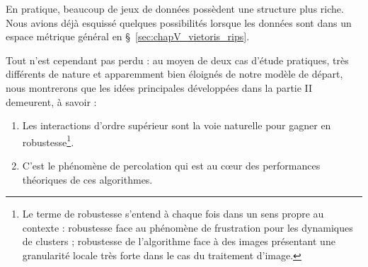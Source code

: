 \documentclass{these-ISSS} %
\begin{document}
En pratique, beaucoup de jeux de données possèdent une structure plus riche.
Nous avions déjà esquissé quelques possibilités lorsque les données sont dans un espace métrique général en \S~\ref{sec:chapV_vietoris_rips}.

Tout n'est cependant pas perdu : au moyen de deux cas d'étude pratiques, très différents de nature et apparemment bien éloignés de notre modèle de départ, nous montrerons que les idées principales développées dans la partie II demeurent, à savoir : 
\begin{enumerate}
    \item Les interactions d'ordre supérieur sont la voie naturelle pour gagner en robustesse\footnote{Le terme de robustesse s'entend à chaque fois dans un sens propre au contexte : robustesse face au phénomène de frustration pour les dynamiques de clusters ; robustesse de l'algorithme face à des images présentant une granularité locale très forte dans le cas du traitement d'image.}.
    \item C'est le phénomène de percolation qui est au cœur des performances théoriques de ces algorithmes.
\end{enumerate}




\end{document}
